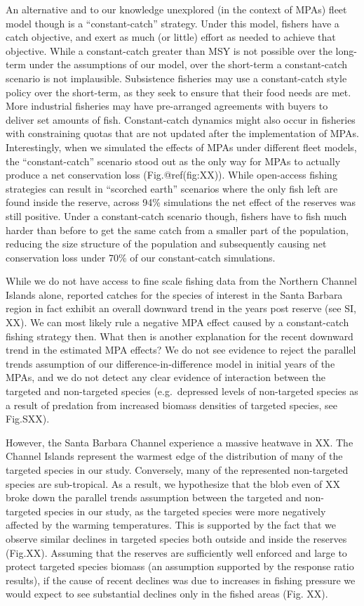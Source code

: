 \documentclass[9pt,twocolumn,twoside,lineno]{pnas-new}
\begin{document}
An alternative and to our knowledge unexplored (in the context of MPAs)
fleet model though is a ``constant-catch'' strategy. Under this model,
fishers have a catch objective, and exert as much (or little) effort as
needed to achieve that objective. While a constant-catch greater than
MSY is not possible over the long-term under the assumptions of our
model, over the short-term a constant-catch scenario is not implausible.
Subsistence fisheries may use a constant-catch style policy over the
short-term, as they seek to ensure that their food needs are met. More
industrial fisheries may have pre-arranged agreements with buyers to
deliver set amounts of fish. Constant-catch dynamics might also occur in
fisheries with constraining quotas that are not updated after the
implementation of MPAs. Interestingly, when we simulated the effects of
MPAs under different fleet models, the ``constant-catch'' scenario stood
out as the only way for MPAs to actually produce a net conservation loss
(Fig.@ref(fig:XX)). While open-access fishing strategies can result in
``scorched earth'' scenarios where the only fish left are found inside
the reserve, across 94\% simulations the net effect of the reserves was
still positive. Under a constant-catch scenario though, fishers have to
fish much harder than before to get the same catch from a smaller part
of the population, reducing the size structure of the population and
subsequently causing net conservation loss under 70\% of our
constant-catch simulations.

While we do not have access to fine scale fishing data from the Northern
Channel Islands alone, reported catches for the species of interest in
the Santa Barbara region in fact exhibit an overall downward trend in
the years post reserve (see SI, XX). We can most likely rule a negative
MPA effect caused by a constant-catch fishing strategy then. What then
is another explanation for the recent downward trend in the estimated
MPA effects? We do not see evidence to reject the parallel trends
assumption of our difference-in-difference model in initial years of the
MPAs, and we do not detect any clear evidence of interaction between the
targeted and non-targeted species (e.g.~depressed levels of non-targeted
species as a result of predation from increased biomass densities of
targeted species, see Fig.SXX).

However, the Santa Barbara Channel experience a massive heatwave in XX.
The Channel Islands represent the warmest edge of the distribution of
many of the targeted species in our study. Conversely, many of the
represented non-targeted species are sub-tropical. As a result, we
hypothesize that the blob even of XX broke down the parallel trends
assumption between the targeted and non-targeted species in our study,
as the targeted species were more negatively affected by the warming
temperatures. This is supported by the fact that we observe similar
declines in targeted species both outside and inside the reserves
(Fig.XX). Assuming that the reserves are sufficiently well enforced and
large to protect targeted species biomass (an assumption supported by
the response ratio results), if the cause of recent declines was due to
increases in fishing pressure we would expect to see substantial
declines only in the fished areas (Fig. XX).
\end{document}

